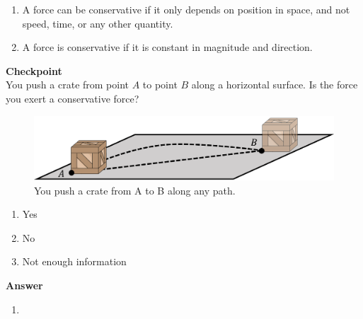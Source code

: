 \begin{enumerate}
\item A force can be conservative if it only depends on position in space, and not speed, time, or any other quantity.
\item A force is conservative if it is constant in magnitude and direction.
\end{enumerate}

\begin{framed}
\textbf{Checkpoint}\\
You push a crate from point $A$ to point $B$ along a horizontal surface. Is the force you exert a conservative force?

\begin{figure}[!htbp]
\centering
\includegraphics[width=0.7\linewidth]{files/crateab-3d642d5d5d5261439832e71d66ccc56a.png}
\caption[]{You push a crate from A to B along any path.}
\label{fig:potentialecons:cratepath}
\end{figure}

\begin{enumerate}
\item Yes
\item No
\item Not enough information
\end{enumerate}

\begin{framed}
\textbf{Answer}\\
\begin{enumerate}[resume]
\item
\end{enumerate}
\end{framed}
\end{framed}

